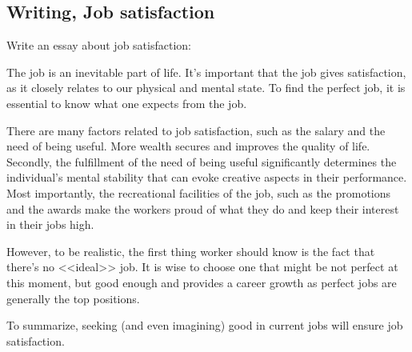 \subsection*{Writing, Job satisfaction}
Write an essay about job satisfaction:

\begin{answer}
The job is an inevitable part of life.
It's important that the job gives satisfaction, as it closely relates to our physical and mental state.
To find the perfect job, it is essential to know what one expects from the job. 

There are many factors related to job satisfaction, such as the salary and the need of being useful.
More wealth secures and improves the quality of life.
Secondly, the fulfillment of the need of being useful significantly determines the individual's mental stability that can evoke creative aspects in their performance.
Most importantly, the recreational facilities of the job, such as the promotions and the awards make the workers proud of what they do and keep their interest in their jobs high. 

However, to be realistic, the first thing worker should know is the fact that there's no <<ideal>> job.
It is wise to choose one that might be not perfect at this moment, but good enough and provides a career growth as perfect jobs are generally the top positions.

To summarize, seeking (and even imagining) good in current jobs will ensure job satisfaction.
\end{answer}


